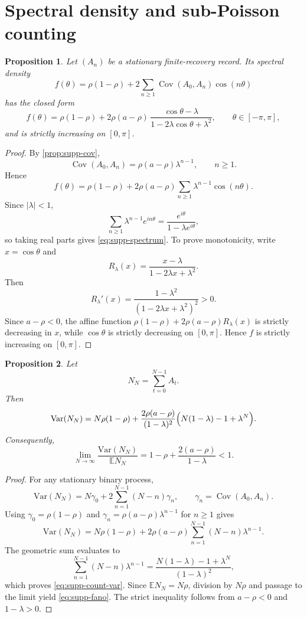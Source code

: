 \documentclass[11pt]{amsart}
\numberwithin{equation}{section}
\newtheorem{proposition}{Proposition}[section]
\theoremstyle{remark}
\newcommand{\EE}{\mathbb{E}}
\newcommand{\Var}{\mathrm{Var}}
\begin{document}
\section{Spectral density and sub-Poisson counting}\label{sec:supp-spectrum}

\begin{proposition}\label{prop:supp-spectrum}
Let $(A_n)$ be a stationary finite-recovery record. Its spectral density
\[
f(\theta)=\rho(1-\rho)+2\sum_{n\ge1}\operatorname{Cov}(A_0,A_n)\cos(n\theta)
\]
has the closed form
\begin{equation}\label{eq:supp-spectrum}
f(\theta)=
\rho(1-\rho)+2\rho(a-\rho)\,
\frac{\cos\theta-\lambda}{1-2\lambda\cos\theta+\lambda^2},
\qquad \theta\in[-\pi,\pi],
\end{equation}
and is strictly increasing on $[0,\pi]$.
\end{proposition}

\begin{proof}
By \cref{prop:supp-cov},
\[
\operatorname{Cov}(A_0,A_n)=\rho(a-\rho)\lambda^{n-1},\qquad n\ge1.
\]
Hence
\[
f(\theta)=
\rho(1-\rho)+2\rho(a-\rho)\sum_{n\ge1}\lambda^{n-1}\cos(n\theta).
\]
Since $|\lambda|<1$,
\[
\sum_{n\ge1}\lambda^{n-1}e^{in\theta}
=
\frac{e^{i\theta}}{1-\lambda e^{i\theta}},
\]
so taking real parts gives \cref{eq:supp-spectrum}. To prove monotonicity, write $x=\cos\theta$ and
\[
R_\lambda(x)=\frac{x-\lambda}{1-2\lambda x+\lambda^2}.
\]
Then
\[
R_\lambda'(x)=\frac{1-\lambda^2}{(1-2\lambda x+\lambda^2)^2}>0.
\]
Since $a-\rho<0$, the affine function $\rho(1-\rho)+2\rho(a-\rho)R_\lambda(x)$ is strictly decreasing in $x$, while $\cos\theta$ is strictly decreasing on $[0,\pi]$. Hence $f$ is strictly increasing on $[0,\pi]$.
\end{proof}

\begin{proposition}\label{prop:supp-fano}
Let
\[
N_N=\sum_{t=0}^{N-1}A_t.
\]
Then
\begin{equation}\label{eq:supp-count-var}
\Var(N_N)=
N\rho(1-\rho)
+
\frac{2\rho(a-\rho)}{(1-\lambda)^2}
\Bigl(N(1-\lambda)-1+\lambda^N\Bigr).
\end{equation}
Consequently,
\begin{equation}\label{eq:supp-fano}
\lim_{N\to\infty}\frac{\Var(N_N)}{\EE N_N}
=
1-\rho+\frac{2(a-\rho)}{1-\lambda}
<1.
\end{equation}
\end{proposition}

\begin{proof}
For any stationary binary process,
\[
\Var(N_N)=N\gamma_0+2\sum_{n=1}^{N-1}(N-n)\gamma_n,
\qquad
\gamma_n=\operatorname{Cov}(A_0,A_n).
\]
Using $\gamma_0=\rho(1-\rho)$ and $\gamma_n=\rho(a-\rho)\lambda^{n-1}$ for $n\ge1$ gives
\[
\Var(N_N)=
N\rho(1-\rho)+2\rho(a-\rho)\sum_{n=1}^{N-1}(N-n)\lambda^{n-1}.
\]
The geometric sum evaluates to
\[
\sum_{n=1}^{N-1}(N-n)\lambda^{n-1}
=
\frac{N(1-\lambda)-1+\lambda^N}{(1-\lambda)^2},
\]
which proves \cref{eq:supp-count-var}. Since $\EE N_N=N\rho$, division by $N\rho$ and passage to the limit yield \cref{eq:supp-fano}. The strict inequality follows from $a-\rho<0$ and $1-\lambda>0$.
\end{proof}
\end{document}
